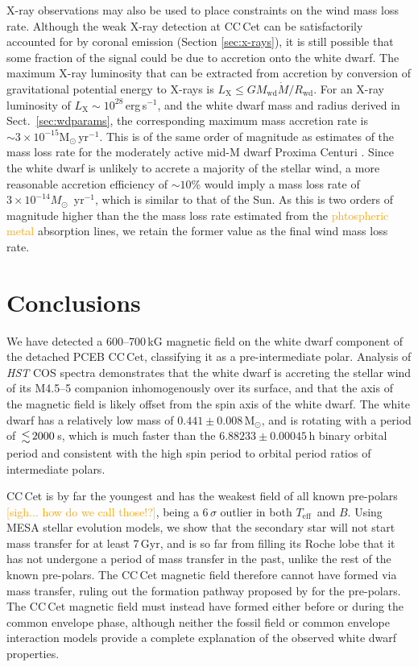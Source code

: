 \documentclass[fleqn,usenatbib]{mnras}
\newcommand{\Msun}{\mbox{$\mathrm{M}_{\odot}$}}
\newcommand{\Teff}{\mbox{$T_{\mathrm{eff}}$}}
\newcommand{\bgc}[1]{\textcolor{orange}{[#1]}}
\newcommand{\bgs}[1]{\textcolor{orange}{#1}}
\begin{document}
X-ray observations may also be used to place constraints on the wind mass loss rate. Although the weak X-ray detection at CC\,Cet can be satisfactorily accounted for by coronal emission (Section \ref{sec:x-rays}), it is still possible that some fraction of the signal could be due to accretion onto the white dwarf. The maximum X-ray luminosity that can be extracted from accretion by conversion of gravitational potential energy to X-rays is $L_\mathrm{X}\leq GM_\mathrm{wd}\dot{M}/R_\mathrm{wd}$. For an X-ray luminosity of $L_\mathrm{X}\sim 10^{28}$\,erg\,s$^{-1}$, and the white dwarf mass and radius derived in Sect.~\ref{sec:wdparams}, the corresponding maximum mass accretion rate is $\sim 3\times 10^{-15} \Msun$\,yr$^{-1}$. This is of the same order of magnitude as estimates of the mass loss rate for the moderately active mid-M dwarf Proxima Centuri \citep[e.g.][]{wood18-1,Wargelin.Drake:02}. Since the white dwarf is unlikely to accrete a majority of the stellar wind, a more reasonable accretion efficiency of $\sim 10$\% would imply a mass loss rate of $3\times 10^{-14} M_\odot$~yr$^{-1}$, which is similar to that of the Sun. As this is two orders of magnitude higher than the 
the mass loss rate estimated from the 
\bgs{phtospheric metal} absorption lines, we retain the former value as the final wind mass loss rate. 

\section{Conclusions}
\label{sec:conc}
We have detected a 600--700\,kG magnetic field on the white dwarf component of the detached PCEB CC\,Cet, classifying it as a pre-intermediate polar. Analysis of \textit{HST} COS spectra demonstrates that the white dwarf is accreting the stellar wind of its M4.5--5 companion inhomogenously over its surface, and that the axis of the magnetic field is likely offset from the spin axis of the white dwarf. The white dwarf has a relatively low mass of $0.441\pm0.008$\,\Msun, and is rotating with a period of $\la 2000$\,s, which is much faster than the $6.88233\pm0.00045$\,h binary orbital period and consistent with the high spin period to orbital period ratios of intermediate polars.

CC\,Cet is by far the youngest and has the weakest field of all known pre-polars \bgc{sigh... how do we call those!?}, being a 6\,$\sigma$ outlier in both \Teff\ and $B$. Using MESA stellar evolution models, we show that the secondary star will not start mass transfer for at least 7\,Gyr, and is so far from filling its Roche lobe that it has not undergone a period of mass transfer in the past, unlike the rest of the known pre-polars. The CC\,Cet magnetic field therefore cannot have formed via mass transfer, ruling out the formation pathway proposed by \citet{schreiberetal21-1} for the pre-polars. The CC\,Cet magnetic field must instead have formed either before or during the common envelope phase, although neither the fossil field or common envelope interaction models provide a complete explanation of the observed white dwarf properties. 
\end{document}
